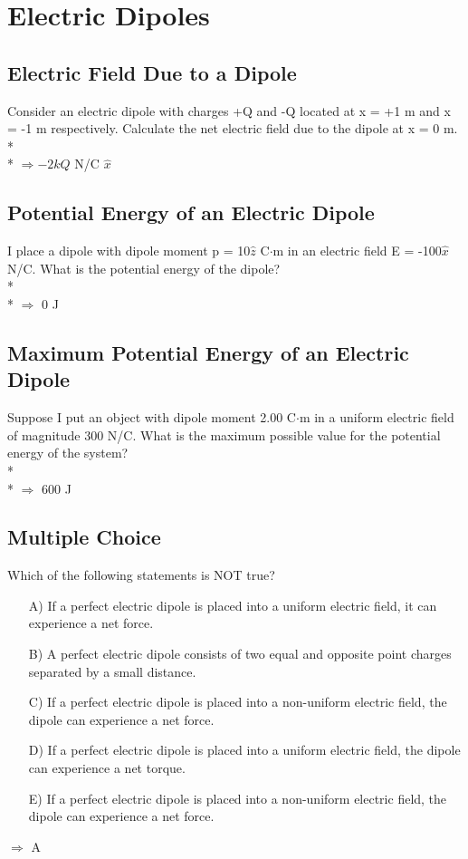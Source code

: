 \documentclass[11pt]{article}
\begin{document}

\pagebreak
\section{Electric Dipoles}
\vspace{10pt}

\subsection{Electric Field Due to a Dipole}
Consider an electric dipole with charges +Q and -Q located at x = +1 m and x = -1 m respectively.  Calculate the net electric field due to the dipole at x = 0 m. \\* \\*
$\Rightarrow -2kQ$ N/C $\hat{x}$

\subsection{Potential Energy of an Electric Dipole}
I place a dipole with dipole moment p = 10$\hat{z}$ C$\cdot$m in an electric field E = -100$\hat{x}$ N/C.  What is the potential energy of the dipole? \\* \\*
$\Rightarrow$ 0 J

\subsection{Maximum Potential Energy of an Electric Dipole}
Suppose I put an object with dipole moment 2.00 C$\cdot$m in a uniform electric field of magnitude 300 N/C.  What is the maximum possible value for the potential energy of the system? \\* \\*
$\Rightarrow$ 600 J

\subsection{Multiple Choice}
Which of the following statements is NOT true?

\begin{itemize}
	\item[A)] If a perfect electric dipole is placed into a uniform electric field, it can experience a net force.
	\item[B)] A perfect electric dipole consists of two equal and opposite point charges separated by a small distance.
	\item[C)] If a perfect electric dipole is placed into a non-uniform electric field, the dipole can experience a net force.
	\item[D)] If a perfect electric dipole is placed into a uniform electric field, the dipole can experience a net torque.
	\item[E)] If a perfect electric dipole is placed into a non-uniform electric field, the dipole can experience a net force.
\end{itemize}
$\Rightarrow$ A
\end{document}
